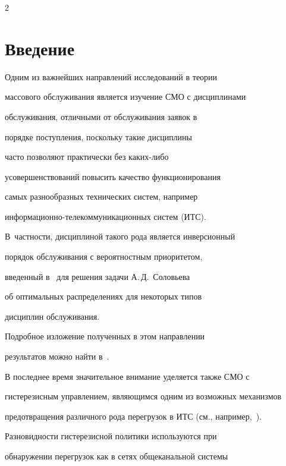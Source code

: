       \begin{multicols}{2}





            \label{st\stat}


            


\section{Введение}





Одним из важнейших направлений исследований в теории


массового обслуживания является изучение СМО с дисциплинами


обслуживания, отличны\-ми от обслуживания заявок в


порядке поступления, поскольку такие дисциплины


часто позволяют практически без каких-либо


усовершенствований повысить качество функционирования


самых разнообразных технических систем, например


ин\-фор\-ма\-ци\-он\-но-те\-ле\-ком\-му\-ни\-ка\-ци\-он\-ных сис\-тем (ИТС).


В~частности, дисциплиной такого рода является инверсионный


порядок обслуживания с вероятностным приоритетом,


введенный в~\cite{1-m} для решения задачи А.\,Д.~Соловьева


об оптимальных распределениях для некоторых типов


дисциплин обслуживания.


Подробное изложение полученных в этом направлении


результатов можно найти в~\cite{2-m}.





В последнее время значительное внимание уделяется также СМО с


гистерезисным управлением, являющимся одним из возможных механизмов


пред\-от\-вра\-ще\-ния различного рода перегрузок в ИТС (см., например,~\cite{3-m}). 


Разновидности гистерезисной политики используются при


обнаружении перегрузок как в сетях общеканальной системы



\end{multicols}
